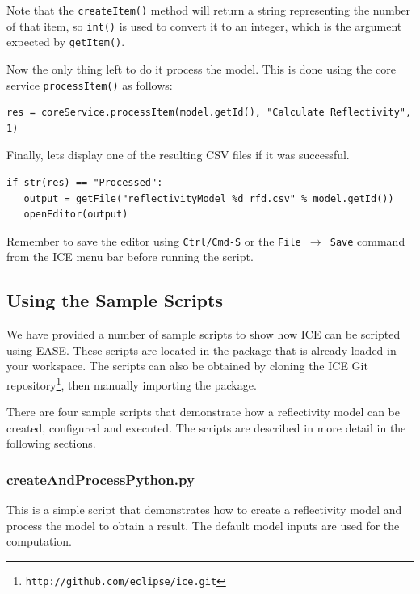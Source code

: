 Note that the \texttt{createItem()} method will return a string representing the
number of that item, so \texttt{int()} is used to convert it to an integer, which is the
argument expected by \texttt{getItem()}.

Now the only thing left to do it process the model. This is done using the core
service \texttt{processItem()} as follows:

{\small
\begin{verbatim}
res = coreService.processItem(model.getId(), "Calculate Reflectivity", 1)
\end{verbatim}
}

Finally, lets display one of the resulting CSV files if it was
successful.

{\small
\begin{verbatim}
if str(res) == "Processed":
   output = getFile("reflectivityModel_%d_rfd.csv" % model.getId()) 
   openEditor(output)
\end{verbatim}
}

Remember to save the editor using \texttt{Ctrl/Cmd-S} or the \texttt{File
$\rightarrow$ Save} command from the ICE menu bar before running the script.

\subsection{Using the Sample Scripts}

\lstset{basicstyle=\ttfamily\scriptsize, breaklines}
\makeatletter
\def\lst@lettertrue{\let\lst@ifletter\iffalse}
\makeatother

We have provided a number of sample scripts to show how ICE can be
scripted using EASE.
These scripts are located in the
 package that is already loaded
in your workspace. The scripts can also be obtained by cloning the ICE Git
repository\footnote{\texttt{http://github.com/eclipse/ice.git}},
then manually importing the 
package.

There are four sample scripts that demonstrate how a reflectivity model
can be created, configured and executed. The scripts are described in
more detail in the following sections.

\subsubsection{createAndProcessPython.py} 

This is a simple script
that demonstrates how to create a reflectivity model and process the model to
obtain a result. The default model inputs are used for the computation.


